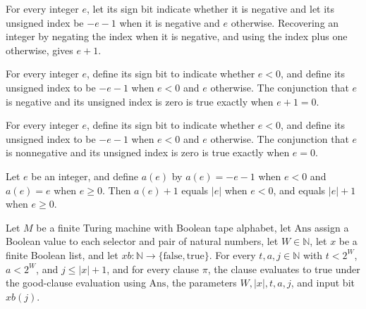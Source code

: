 \begin{theorem}
\label{Complexity.Meyer.edge_c2}
\leanok
{}
For every integer $e$, let its sign bit indicate whether it is negative and let its
unsigned index be $-e-1$ when it is negative and $e$ otherwise. Recovering an integer by
negating the index when it is negative, and using the index plus one otherwise, gives
$e+1$.
\end{theorem}

\begin{theorem}
\label{Complexity.Meyer.edge_E1}
\leanok
{}
For every integer $e$, define its sign bit to indicate whether $e<0$, and define its
unsigned index to be $-e-1$ when $e<0$ and $e$ otherwise. The conjunction that $e$ is
negative and its unsigned index is zero is true exactly when $e+1=0$.
\end{theorem}

\begin{theorem}
\label{Complexity.Meyer.edge_E0}
\leanok
{}
For every integer $e$, define its sign bit to indicate whether $e<0$, and define its
unsigned index to be $-e-1$ when $e<0$ and $e$ otherwise. The conjunction that $e$ is
nonnegative and its unsigned index is zero is true exactly when $e=0$.
\end{theorem}

\begin{theorem}
\label{Complexity.Meyer.aE_add_one}
\leanok
{}
Let $e$ be an integer, and define $a(e)$ by $a(e)=-e-1$ when $e<0$ and $a(e)=e$ when
$e\geq 0$. Then $a(e)+1$ equals $|e|$ when $e<0$, and equals $|e|+1$ when $e\geq 0$.
\end{theorem}

\begin{definition}
\label{Complexity.Meyer.AllGood}
\leanok
{}
Let $M$ be a finite Turing machine with Boolean tape alphabet, let $\mathrm{Ans}$ assign
a Boolean value to each selector and pair of natural numbers, let $W\in\mathbb{N}$, let
$x$ be a finite Boolean list, and let
$xb:\mathbb{N}\to\{\mathrm{false},\mathrm{true}\}$. For every $t,a,j\in\mathbb{N}$ with
$t<2^W$, $a<2^W$, and $j\le |x|+1$, and for every clause $\pi$, the clause evaluates to
true under the good-clause evaluation using $\mathrm{Ans}$, the parameters
$W,|x|,t,a,j$, and input bit $xb(j)$.
\end{definition}

